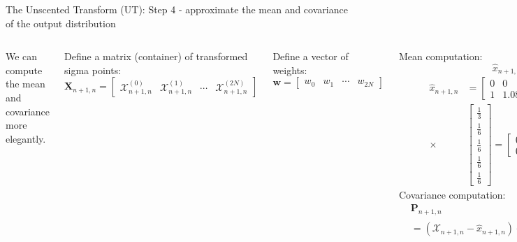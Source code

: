 \begin{frame}{The Unscented Transform (UT): Step 4 - approximate the mean and covariance of the output distribution}
\begin{columns}
We can compute the mean and covariance more elegantly.

Define a matrix (container) of transformed sigma points:
\[
\mathbf{X}_{n+1,n} =
\begin{bmatrix}
\mathcal{X}^{(0)}_{n+1,n} & \mathcal{X}^{(1)}_{n+1,n} & \cdots & \mathcal{X}^{(2N)}_{n+1,n}
\end{bmatrix}
\]

Define a vector of weights:
\[
\mathbf{w} =
\begin{bmatrix}
w_0 & w_1 & \cdots & w_{2N}
\end{bmatrix}
\]

Mean computation:
\[
\hat{x}_{n+1,n} = \mathcal{X}_{n+1,n} \mathbf{w}
\]
\begin{align*}
\hat{x}_{n+1,n} & =
\begin{bmatrix}
0 & 0 & -0.762 & 0 & 0.762 \\
1 & 1.0866 & 0.648 & 0.913 & 0.648
\end{bmatrix}\\
\times &
\begin{bmatrix}
\frac{1}{3} \\
\frac{1}{6} \\
\frac{1}{6} \\
\frac{1}{6} \\
\frac{1}{6}
\end{bmatrix}
=
\begin{bmatrix}
0 \\
0.8826
\end{bmatrix}    
\end{align*}
Covariance computation:
\begin{align*}
& \mathbf{P}_{n+1,n}  \\ & = (\mathcal{X}_{n+1,n} - \hat{x}_{n+1,n}) \cdot \text{diag}(\mathbf{w}) \cdot (\mathcal{X}_{n+1,n} - \hat{x}_{n+1,n})^T
\end{align*}
\begin{figure}
    \centering
    \includegraphics[width=0.5\linewidth]{Figures//Part3/2DUncentedTransform.png}
    \caption{2D RV Unscented Transform.}
\end{figure}
\begin{itemize}
    \item The green shape is the covariance ellipse of the input random variable after the non-linear transformation. The red circles on the right plot are the sigma points after the non-linear transformation ($\mathcal{X}_{n+1,n}$).


\end{itemize}
\end{columns}
\end{frame}
